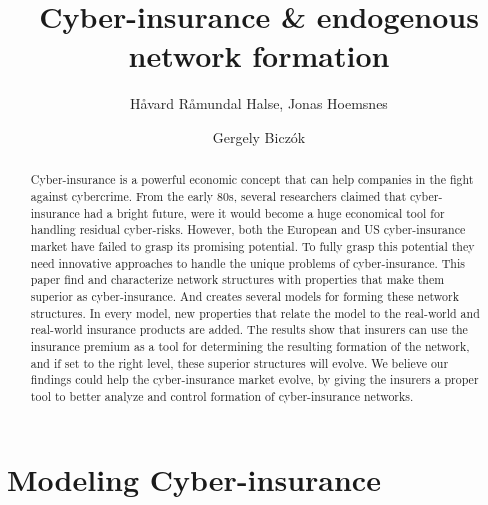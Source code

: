 \documentclass{llncs}
\begin{document}
\title{Cyber-insurance \& endogenous network formation}

\author{Håvard Råmundal Halse, Jonas Hoemsnes \and Gergely Biczók}


\maketitle
%

\begin{abstract}
Cyber-insurance is a powerful economic concept that can
help companies in the fight against cybercrime. From the early 80s, several
researchers claimed that cyber-insurance had a bright future, were it
would become a huge economical tool for handling residual cyber-risks.
However, both the European and US cyber-insurance market have failed
to grasp its promising potential. To fully grasp this potential they need
innovative approaches to handle the unique problems of cyber-insurance.
This paper find and characterize network structures with properties that
make them superior as cyber-insurance. And creates several models for
forming these network structures. In every model, new properties that
relate the model to the real-world and real-world insurance products are
added. The results show that insurers can use the insurance premium as
a tool for determining the resulting formation of the network, and if set
to the right level, these superior structures will evolve.
We believe our findings could help the cyber-insurance market evolve, by
giving the insurers a proper tool to better analyze and control formation
of cyber-insurance networks.
\end{abstract}
%



\section{Modeling Cyber-insurance}

\end{document}
